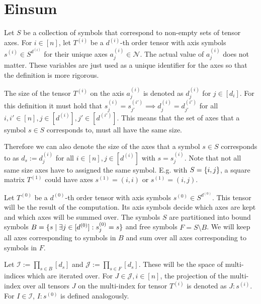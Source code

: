 \section{Einsum}

Let $S$ be a collection of symbols that correspond to non-empty sets of tensor axes.
For $i \in [n]$, let $T^{(i)}$ be a $d^{(i)}$-th order tensor with axis symbols $s^{(i)} \in S^{d^{(i)}}$ for their unique axes $a^{(i)}_j \in \mathcal{N}$.
The actual value of $a^{(i)}_j$ does not matter. These variables are just used as a unique identifier for the axes so that the definition is more rigorous.

The size of the tensor $T^{(i)}$ on the axis $a^{(i)}_j$ is denoted as $d^{(i)}_j$ for $j \in [d_i]$.
For this definition it must hold that $s^{(i)}_j = s^{(i')}_{j'} \implies d^{(i)}_j = d^{(i')}_{j'}$ for all $i,i' \in [n], j \in [d^{(i)}], j' \in [d^{(i')}]$.
This means that the set of axes that a symbol $s \in S$ corresponds to, must all have the same size.

Therefore we can also denote the size of the axes that a symbol $s \in S$ corresponds to as $d_s := d^{(i)}_j$ for all $i \in [n], j \in [d^{(i)}]$ with $s = s^{(i)}_j$.
Note that not all same size axes have to assigned the same symbol. E.g. with $S = \left\lbrace i,j \right\rbrace$, a square matrix $T^{(1)}$ could have axes $s^{(1)} = (i, i)$ or $s^{(1)} = (i, j)$.

Let $T^{(0)}$ be a $d^{(0)}$-th order tensor with axis symbols $s^{(0)} \in S^{d^{(0)}}$.
This tensor will be the result of the computation.
Its axis symbols decide which axes are kept and which axes will be summed over.
The symbols $S$ are partitioned into bound symbols $B = \lbrace s \mid \exists j \in [d^{(0)}]: s^{(0)}_j = s \rbrace$ and  free symbols $F = S \setminus B$.
We will keep all axes corresponding to symbols in $B$ and sum over all axes corresponding to symbols in $F$.

Let $\mathcal{I} := \prod_{s \in B} [d_s]$ and $\mathcal{J} := \prod_{s \in F} [d_s]$.
These will be the space of multi-indices which are iterated over.
For $J \in \mathcal{J}, i \in [n]$, the projection of the multi-index over all tensors $J$ on the multi-index for tensor $T^{(i)}$ is denoted as $J:s^{(i)}$.
For $I \in \mathcal{I}$, $I:s^{(0)}$ is defined analogously.

